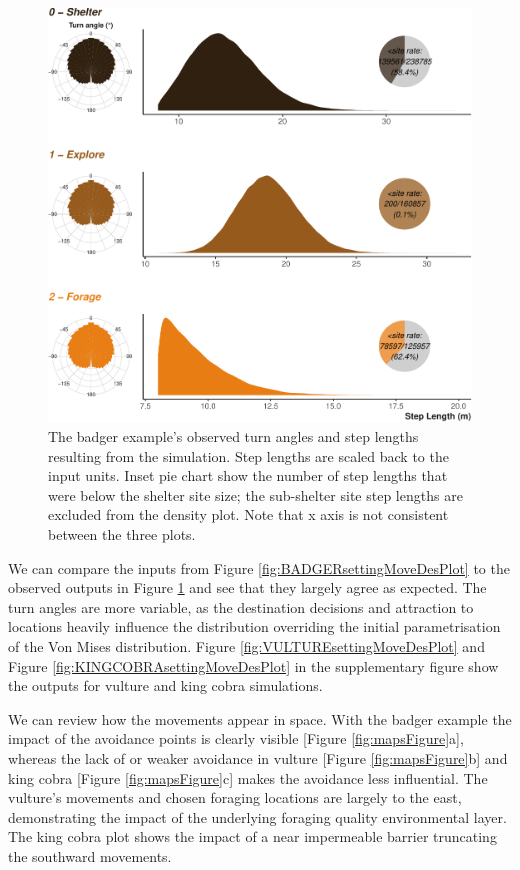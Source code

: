 \documentclass[10pt,a4paper]{article}
\begin{document}
\begin{figure}

{\centering \includegraphics{Agent-based_model_walkthrough_files/figure-latex/BADGERmoveCharFigure-1} 

}

\caption{The badger example's observed turn angles and step lengths resulting from the simulation. Step lengths are scaled back to the input units. Inset pie chart show the number of step lengths that were below the shelter site size; the sub-shelter site step lengths are excluded from the density plot. Note that x axis is not consistent between the three plots.}\label{fig:BADGERmoveCharFigure}
\end{figure}

We can compare the inputs from Figure \ref{fig:BADGERsettingMoveDesPlot} to the observed outputs in Figure \ref{fig:BADGERmoveCharFigure} and see that they largely agree as expected.
The turn angles are more variable, as the destination decisions and attraction to locations heavily influence the distribution overriding the initial parametrisation of the Von Mises distribution.
Figure \ref{fig:VULTUREsettingMoveDesPlot} and Figure \ref{fig:KINGCOBRAsettingMoveDesPlot} in the supplementary figure show the outputs for vulture and king cobra simulations.

We can review how the movements appear in space.
With the badger example the impact of the avoidance points is clearly visible {[}Figure \ref{fig:mapsFigure}a{]}, whereas the lack of or weaker avoidance in vulture {[}Figure \ref{fig:mapsFigure}b{]} and king cobra {[}Figure \ref{fig:mapsFigure}c{]} makes the avoidance less influential.
The vulture's movements and chosen foraging locations are largely to the east, demonstrating the impact of the underlying foraging quality environmental layer.
The king cobra plot shows the impact of a near impermeable barrier truncating the southward movements.
\end{document}
